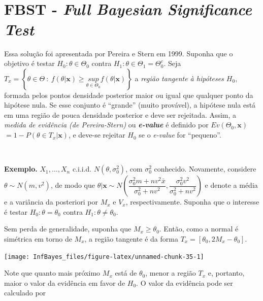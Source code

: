 \documentclass[
]{book}
\begin{document}
\(~\)

\(~\)

\hypertarget{fbst---full-bayesian-significance-test}{%
\section{\texorpdfstring{FBST - \emph{Full Bayesian Significance Test}}{FBST - Full Bayesian Significance Test}}\label{fbst---full-bayesian-significance-test}}

Essa solução foi apresentada por Pereira e Stern em 1999. Suponha que o objetivo é testar \(H_0:\theta\in\Theta_0\) contra \(H_1:\theta \in \Theta_1=\Theta_0^c\). Seja \(T_x=\left\{\theta\in\Theta ~:~f(\theta|\boldsymbol x)\geq \underset{\theta\in\Theta_0}{sup}f(\theta|\boldsymbol x)\right\}\) a \emph{região tangente à hipóteses \(H_0\)}, formada pelos pontos densidade posterior maior ou igual que qualquer ponto da hipótese nula. Se esse conjunto é ``grande'' (muito provável), a hipótese nula está em uma região de pouca densidade posterior e deve ser rejeitada. Assim, a \emph{medida de evidência (de Pereira-Stern)} ou \textbf{\emph{e-value}} é definido por \(Ev(\Theta_0,\boldsymbol x)\) \(=1-P\left(\theta\in T_x \big|\boldsymbol x \right)\), e deve-se rejeitar \(H_0\) se o \emph{e-value} for ``pequeno''.

\(~\)

\textbf{Exemplo.} \(X_1,...,X_n\) c.i.i.d. \(N(\theta,{\sigma}_0^2)\), com \({\sigma}_0^2\) conhecido. Novamente, considere \(\theta\sim N(m,v^2)\), de modo que \(\theta|\boldsymbol x \sim N\left(\dfrac{{\sigma}_0^2m+nv^2\bar{x}}{{\sigma}_0^2+nv^2},\dfrac{{\sigma}_0^2v^2}{{\sigma}_0^2+nv^2}\right)\) e denote a média e a variância da posteriori por \(M_x\) e \(V_x\), respectivamente. Suponha que o interesse é testar \(H_0:\theta=\theta_0\) contra \(H_1:\theta\neq\theta_0\).

Sem perda de generalidade, suponha que \(M_x \geq \theta_0\). Então, como a normal é simétrica em torno de \(M_x\), a região tangente é da forma \(T_x=[\theta_0,2M_x-\theta_0]\).

\begin{center}\texttt{[image: InfBayes\_files/figure-latex/unnamed-chunk-35-1]} \end{center}

Note que quanto mais próximo \(M_x\) está de \(\theta_0\), menor a região \(T_x\) e, portanto, maior o valor da evidência em favor de \(H_0\). O valor da evidência pode ser calculado por
\end{document}
